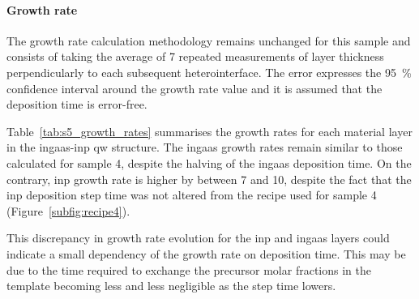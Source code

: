 \paragraph{Growth rate} The growth rate calculation methodology remains unchanged for this sample and consists of taking the average of \num{7} repeated measurements of layer thickness perpendicularly to each subsequent heterointerface. The error expresses the \qty{95}{\%} confidence interval around the growth rate value and it is assumed that the deposition time is error-free.

Table~\ref{tab:s5_growth_rates} summarises the growth rates for each material layer in the \acs{ingaas}-\acs{inp} \acl{qw} structure. The \acs{ingaas} growth rates remain similar to those calculated for sample 4, despite the halving of the \acs{ingaas} deposition time. On the contrary, \acs{inp} growth rate is higher by between \qty{7}{\nmmin} and \qty{10}{\nmmin}, despite the fact that the \acs{inp} deposition step time was not altered from the recipe used for sample 4 (Figure~\ref{subfig:recipe4}). 

This discrepancy in growth rate evolution for the \acs{inp} and \acs{ingaas} layers could indicate a small dependency of the growth rate on deposition time. This may be due to the time required to exchange the precursor molar fractions in the template becoming less and less negligible as the step time lowers.
\par

